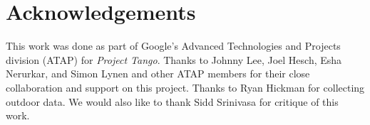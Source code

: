 \documentclass[10pt,twocolumn,letterpaper]{article}
\begin{document}
\section*{Acknowledgements}
This work was done as part of Google's Advanced Technologies and Projects
division (ATAP) for \emph{Project Tango}. Thanks to Johnny Lee, Joel Hesch, Esha
Nerurkar, and Simon Lynen and other ATAP members for their close collaboration
and support on this project. Thanks to Ryan Hickman for collecting outdoor data.
We would also like to thank Sidd Srinivasa for critique of this work.


 
\end{document}
